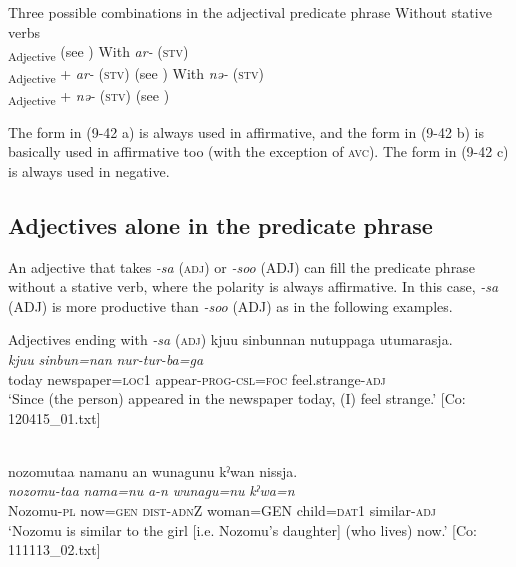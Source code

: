 \ea   Three possible combinations in the adjectival predicate phrase\label{ex:9.42}
\ea Without stative verbs\\\textsubscript{Adjective}  (see )
\ex  With \textit{ar-} (\textsc{stv})\\\textsubscript{Adjective}  + \textit{ar-} (\textsc{stv})  (see )
\ex With \textit{nə-} (\textsc{stv})\\\textsubscript{Adjective}  + \textit{nə-} (\textsc{stv})  (see )
    \z
\z

The form in (9-42 a) is always used in affirmative, and the form in (9-42 b) is basically used in affirmative too (with the exception of \textsc{avc}). The form in (9-42 c) is always used in negative.

\subsection{Adjectives alone in the predicate phrase}\label{sec:9.2.1}

An adjective that takes \textit{{}-sa} (\textsc{adj}) or \textit{{}-soo} (ADJ) can fill the predicate phrase without a stative verb, where the polarity is always affirmative. In this case, \textit{{}-sa} (ADJ) is more productive than \textit{{}-soo} (ADJ) as in the following examples.

\ea   \label{ex:9.43}
\exi{} Adjectives ending with \textit{{}-sa} (\textsc{adj})
\ea %
 \glll  kjuu  sinbunnan  nutuppaga  utumarasja.\\
      \textit{kjuu}  \textit{sinbun=nan}  \textit{nur-tur-ba=ga}  \textit{}\\
      today  newspaper=\textsc{loc}1  appear-\textsc{prog}-\textsc{csl}=\textsc{foc}  feel.strange-\textsc{adj}\\
      \glt       ‘Since (the person) appeared in the newspaper today, (I) feel strange.’ [Co: 120415\_01.txt]

  \ex{}\\
\glll nozomutaa  namanu  an  wunagunu  kˀwan   nissja.\\
      \textit{nozomu-taa}  \textit{nama=nu}  \textit{a-n}  \textit{wunagu=nu}  \textit{kˀwa=n} \textit{}\\
      Nozomu-\textsc{pl}  now=\textsc{gen}  \textsc{dist}-\textsc{adn}Z  woman=GEN  child=\textsc{dat}1  similar-\textsc{adj}\\
      \glt    ‘Nozomu is similar to the girl [i.e. Nozomu’s daughter] (who lives) now.’  [Co: 111113\_02.txt]

